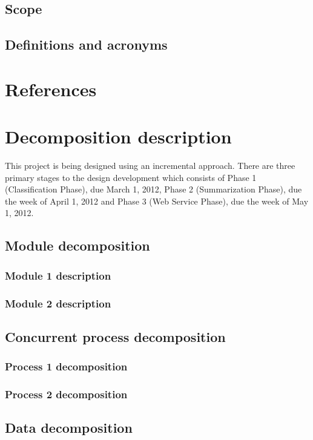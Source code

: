 \documentclass[12pt]{article}
\begin{document}
\subsection{Scope}
\subsection{Definitions and acronyms}

\section{References}

\section{Decomposition description}
This project is being designed using an incremental approach. There are three primary stages to the design development which consists of Phase 1 (Classification Phase), due March 1, 2012, Phase 2 (Summarization Phase), due the week of April 1, 2012 and Phase 3 (Web Service Phase), due the week of May 1, 2012. 

\subsection{Module decomposition}
\subsubsection{Module 1 description}
\subsubsection{Module 2 description}

\subsection{Concurrent process decomposition}
\subsubsection{Process 1 decomposition}
\subsubsection{Process 2 decomposition}

\subsection{Data decomposition}
\end{document}
